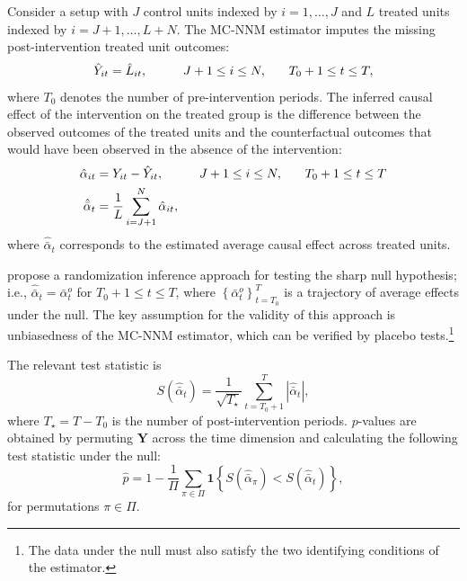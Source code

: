 \documentclass[12pt]{article}
\begin{document}
Consider a setup with $J$ control units indexed by $i=1, \ldots, J$ and $L$ treated units indexed by $i = J+1, \ldots, L+N$. The MC-NNM estimator imputes the missing post-intervention treated unit outcomes:
%
\begin{align}
\hat{Y}_{it} = \hat{L}_{it}, \hspace{10mm} J+1 \leq i \leq N, \, \hspace{5mm} \, T_0+1 \leq t \leq T, \label{eq:mc-post}
\end{align} 
%
where $T_0$ denotes the number of pre-intervention periods. The inferred causal effect of the intervention on the treated group is the difference between the observed outcomes of the treated units and the counterfactual outcomes that would have been observed in the absence of the intervention:
%
\begin{align}
\hat{\alpha}_{it} &= Y_{it} - \hat{Y}_{it}, \hspace{10mm} J+1 \leq i \leq N, \, \hspace{5mm} \, T_0+1 \leq t \leq T \\ 
\hat{\bar{\alpha}}_{t} & = \frac{1}{L} \sum^{N}_{i=J+1} \hat{\alpha}_{it},  \label{eq:avg-pointwise}
\end{align}
%
where $\hat{\bar{\alpha}}_{t}$ corresponds to the estimated average causal effect across treated units. 

\citet{chernozhukov2017exact} propose a randomization inference approach for testing the sharp null hypothesis; i.e., $\hat{\bar{\alpha}}_{t} = \bar{\alpha}^{o}_{t}$ for $T_0+1 \leq t \leq T$, where $\left\{\bar{\alpha}^{o}_{t}\right\}_{t=T_0}^T$ is a trajectory of average effects under the null. The key assumption for the validity of this approach is unbiasedness of the MC-NNM estimator, which can be verified by placebo tests.\footnote{The data under the null must also satisfy the two identifying conditions of the estimator.} 

The relevant test statistic is 
%
\begin{equation}
S (\hat{\bar{\alpha}}_{t}) = \frac{1}{\sqrt{T_\star}} \sum_{t=T_0 +1}^{T} |\hat{\bar{\alpha}}_{t}|,
\end{equation}
%
where $T_\star = T-T_0$ is the number of post-intervention periods. $p$-values are obtained by permuting $\mathbf{Y}$ across the time dimension and calculating the following test statistic under the null:
%
\begin{equation}
\hat{p} = 1 - \frac{1}{\Pi} \sum_{\pi \in \Pi} \textbf{1} \left\{S (\hat{\bar{\alpha}}_{\pi}) < S (\hat{\bar{\alpha}}_{t}) \right\}, 
\end{equation}
%
for permutations $\pi \in \Pi$. 
\end{document}
